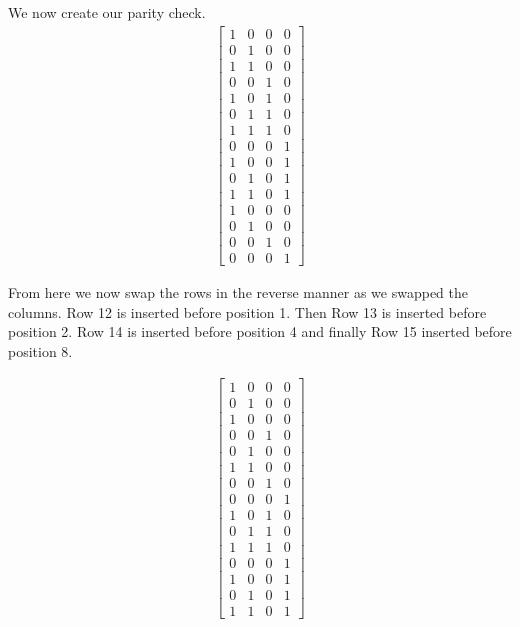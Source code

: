\documentclass{article}
\begin{document}
We now create our parity check.
\begin{align*}
    \begin{bmatrix}
        1 & 0 & 0 & 0 \\
        0 & 1 & 0 & 0 \\
        1 & 1 & 0 & 0 \\
        0 & 0 & 1 & 0 \\
        1 & 0 & 1 & 0 \\
        0 & 1 & 1 & 0 \\
        1 & 1 & 1 & 0 \\
        0 & 0 & 0 & 1 \\
        1 & 0 & 0 & 1 \\
        0 & 1 & 0 & 1 \\
        1 & 1 & 0 & 1 \\
        1 & 0 & 0 & 0 \\
        0 & 1 & 0 & 0 \\
        0 & 0 & 1 & 0 \\
        0 & 0 & 0 & 1
    \end{bmatrix}
\end{align*}

From here we now swap the rows in the reverse manner as we swapped the columns.
Row 12 is inserted before position 1.
Then Row 13 is inserted before position 2.
Row 14 is inserted before position 4 and finally Row 15 inserted before
position 8.

\begin{align*}
    \begin{bmatrix}
        1 & 0 & 0 & 0 \\
        0 & 1 & 0 & 0 \\
        1 & 0 & 0 & 0 \\
        0 & 0 & 1 & 0 \\
        0 & 1 & 0 & 0 \\
        1 & 1 & 0 & 0 \\
        0 & 0 & 1 & 0 \\
        0 & 0 & 0 & 1 \\
        1 & 0 & 1 & 0 \\
        0 & 1 & 1 & 0 \\
        1 & 1 & 1 & 0 \\
        0 & 0 & 0 & 1 \\
        1 & 0 & 0 & 1 \\
        0 & 1 & 0 & 1 \\
        1 & 1 & 0 & 1
    \end{bmatrix}
\end{align*}
\end{document}
